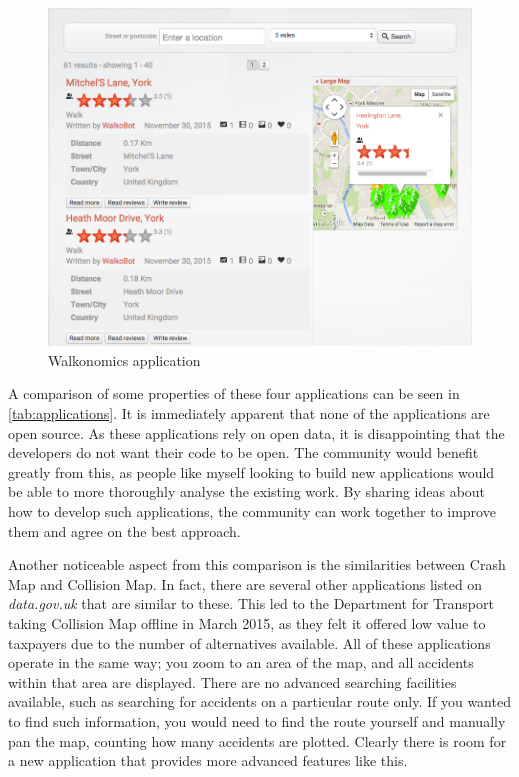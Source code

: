 \documentclass[authoryearcitations]{UoYCSproject}
\begin{document}
\begin{figure}
	\includegraphics[scale=0.4]{walkonomics}
	\caption{Walkonomics application}
	\label{fig:walkonomics}
\end{figure}

A comparison of some properties of these four applications can be seen in \autoref{tab:applications}. It is immediately apparent that none of the applications are open source. As these applications rely on open data, it is disappointing that the developers do not want their code to be open. The community would benefit greatly from this, as people like myself looking to build new applications would be able to more thoroughly analyse the existing work. By sharing ideas about how to develop such applications, the community can work together to improve them and agree on the best approach.

Another noticeable aspect from this comparison is the similarities between Crash Map and Collision Map. In fact, there are several other applications listed on \textit{data.gov.uk} that are similar to these. This led to the Department for Transport taking Collision Map offline in March 2015, as they felt it offered low value to taxpayers due to the number of alternatives available.  All of these applications operate in the same way; you zoom to an area of the map, and all accidents within that area are displayed. There are no advanced searching facilities available, such as searching for accidents on a particular route only. If you wanted to find such information, you would need to find the route yourself and manually pan the map, counting how many accidents are plotted. Clearly there is room for a new application that provides more advanced features like this.  
\end{document}

